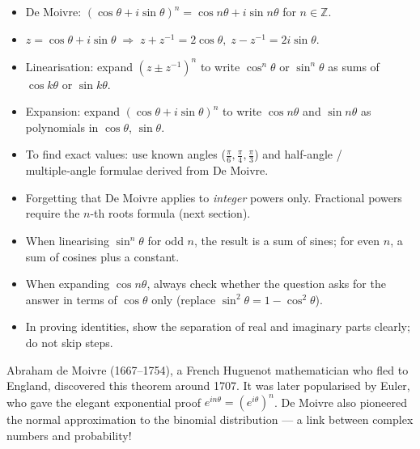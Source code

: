 \documentclass[11pt]{article}
\begin{document}
\begin{aretenir}
\begin{itemize}
\item De Moivre: $(\cos\theta + i\sin\theta)^n = \cos n\theta + i\sin n\theta$ for $n\in\mathbb{Z}$.
\item $z = \cos\theta + i\sin\theta \;\Rightarrow\; z+z^{-1}=2\cos\theta,\; z-z^{-1}=2i\sin\theta$.
\item Linearisation: expand $(z\pm z^{-1})^n$ to write $\cos^n\theta$ or $\sin^n\theta$ as sums of $\cos k\theta$ or $\sin k\theta$.
\item Expansion: expand $(\cos\theta + i\sin\theta)^n$ to write $\cos n\theta$ and $\sin n\theta$ as polynomials in $\cos\theta$, $\sin\theta$.
\item To find exact values: use known angles ($\frac{\pi}{6},\frac{\pi}{4},\frac{\pi}{3}$) and half‑angle / multiple‑angle formulae derived from De Moivre.
\end{itemize}
\end{aretenir}

\begin{attention}
\begin{itemize}
\item Forgetting that De Moivre applies to \emph{integer} powers only. Fractional powers require the $n$-th roots formula (next section).
\item When linearising $\sin^n\theta$ for odd $n$, the result is a sum of sines; for even $n$, a sum of cosines plus a constant.
\item When expanding $\cos n\theta$, always check whether the question asks for the answer in terms of $\cos\theta$ only (replace $\sin^2\theta = 1-\cos^2\theta$).
\item In proving identities, show the separation of real and imaginary parts clearly; do not skip steps.
\end{itemize}
\end{attention}

\begin{savaistu}
Abraham de Moivre (1667--1754), a French Huguenot mathematician who fled to England, discovered this theorem around 1707. It was later popularised by Euler, who gave the elegant exponential proof $e^{in\theta}=(e^{i\theta})^n$. De Moivre also pioneered the normal approximation to the binomial distribution --- a link between complex numbers and probability!
\end{savaistu}
\end{document}
